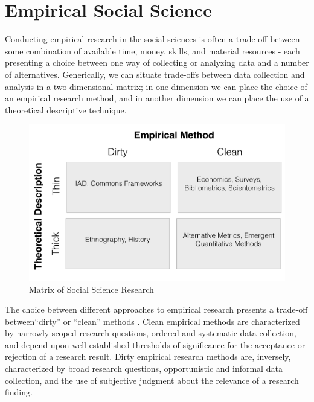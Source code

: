 \documentclass[thesis,tocnosub,noragright,centerchapter,12pt]{uiucecethesis09}
\begin{document}
\section{Empirical Social Science}

Conducting empirical research in the social sciences is often a
trade-off between some combination of available time, money, skills, and
material resources - each presenting a choice between one way of collecting or analyzing data and a number of
alternatives. Generically, we can situate trade-offs between data
collection and analysis in a two dimensional matrix; in one dimension we
can place the choice of an empirical research method, and in another
dimension we can place the use of a theoretical descriptive technique.\\

\begin{figure}
\centering
\includegraphics[width=\textwidth]{MethodsMatrix}
\caption{Matrix of Social Science Research \citep[adapted from][]{boettke2000review}}
\label{fig:my_label}
\end{figure}

The choice between different approaches to empirical research presents a
trade-off between``dirty'' or ``clean'' methods \citep{boettke2000review}. Clean empirical methods are characterized by narrowly scoped research questions, ordered and systematic data collection, and depend upon well
established thresholds of significance for the acceptance or rejection
of a research result. Dirty empirical research methods are, inversely, characterized by broad
research questions, opportunistic and informal data collection, and the
use of subjective judgment about the relevance of a research finding.\\
\end{document}
